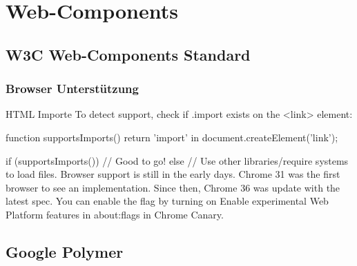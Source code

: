 \section{Web-Components}
\label{sec:3_Web_Components}





\subsection{W3C Web-Components Standard}
\label{sec:3_W3C}











\subsubsection{Browser Unterstützung}
\label{sec:3_WC_Support}


HTML Importe
To detect support, check if .import exists on the <link> element:

function supportsImports() {
  return 'import' in document.createElement('link');
}

if (supportsImports()) {
  // Good to go!
} else {
  // Use other libraries/require systems to load files.
}
Browser support is still in the early days. Chrome 31 was the first browser to see an implementation. Since then, Chrome 36 was update with the latest spec. You can enable the flag by turning on Enable experimental Web Platform features in about:flags in Chrome Canary.



\subsection{Google Polymer}
\label{sec:3_Polymer}




